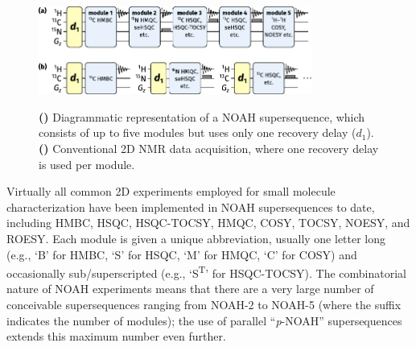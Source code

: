 \documentclass[a4paper,11pt]{article}
\begin{document}
\begin{refsection}
\begin{figure}
    \centering
    \includegraphics[width=0.8\textwidth]{noah_diagram.pdf}
    {\label{fig:noah_diagram_noah}}
    {\label{fig:noah_diagram_conventional}}
    \caption{
        \textbf{()} Diagrammatic representation of a NOAH supersequence, which consists of up to five modules but uses only one recovery delay (\(d_1\)).
        \textbf{()} Conventional 2D NMR data acquisition, where one recovery delay is used per module.
    }
    \label{fig:noah_diagram}
\end{figure}

Virtually all common 2D experiments employed for small molecule characterization have been implemented in NOAH supersequences to date, including HMBC, HSQC, HSQC-TOCSY, HMQC, COSY, TOCSY, NOESY, and ROESY.
Each module is given a unique abbreviation, usually one letter long (e.g., `B' for HMBC, `S' for HSQC, `M' for HMQC, `C' for COSY) and occasionally sub/superscripted (e.g., `S\textsuperscript{T}' for HSQC-TOCSY).
The combinatorial nature of NOAH experiments means that there are a very large number of conceivable supersequences ranging from NOAH-2 to NOAH-5 (where the suffix indicates the number of modules); the use of parallel ``\textit{p}-NOAH'' supersequences\autocite{Kupce2021JACSA} extends this maximum number even further.


\end{refsection}
\end{document}
